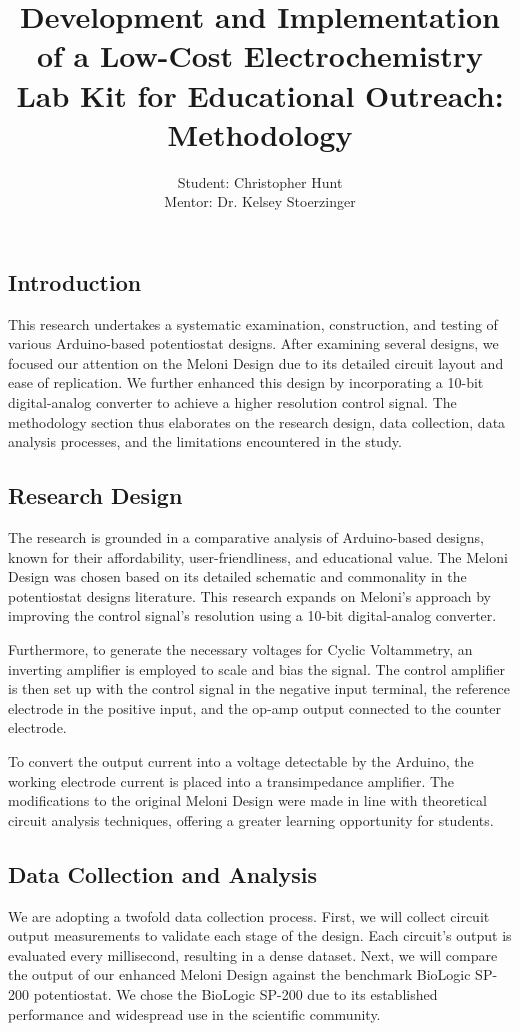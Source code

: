 \documentclass{article}
\title{\textcolor{mycolor}{\textbf{{\huge Development and Implementation of a Low-Cost Electrochemistry Lab Kit for Educational Outreach: Methodology}}}}
\author{Student: Christopher Hunt \\ Mentor: Dr. Kelsey Stoerzinger}
\date{}
\begin{document}
\pagestyle{fancy}
\fancyhf{}
\rfoot{}
\rhead{\thepage}
\maketitle
\subsection*{Introduction}
This research undertakes a systematic examination, construction, and testing of various Arduino-based potentiostat designs. After examining several designs, we focused our attention on the Meloni Design due to its detailed circuit layout and ease of replication. We further enhanced this design by incorporating a 10-bit digital-analog converter to achieve a higher resolution control signal. The methodology section thus elaborates on the research design, data collection, data analysis processes, and the limitations encountered in the study.

\subsection*{Research Design}
The research is grounded in a comparative analysis of Arduino-based designs, known for their affordability, user-friendliness, and educational value. The Meloni Design was chosen based on its detailed schematic and commonality in the potentiostat designs literature. This research expands on Meloni’s approach by improving the control signal's resolution using a 10-bit digital-analog converter.

Furthermore, to generate the necessary voltages for Cyclic Voltammetry, an inverting amplifier is employed to scale and bias the signal. The control amplifier is then set up with the control signal in the negative input terminal, the reference electrode in the positive input, and the op-amp output connected to the counter electrode.

To convert the output current into a voltage detectable by the Arduino, the working electrode current is placed into a transimpedance amplifier. The modifications to the original Meloni Design were made in line with theoretical circuit analysis techniques, offering a greater learning opportunity for students.

\subsection*{Data Collection and Analysis}
We are adopting a twofold data collection process. First, we will collect circuit output measurements to validate each stage of the design. Each circuit’s output is evaluated every millisecond, resulting in a dense dataset. Next, we will compare the output of our enhanced Meloni Design against the benchmark BioLogic SP-200 potentiostat. We chose the BioLogic SP-200 due to its established performance and widespread use in the scientific community.
\end{document}
